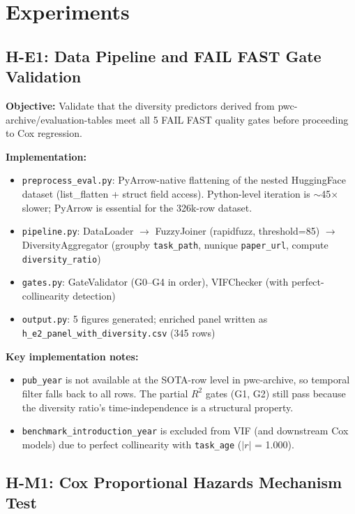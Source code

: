 \section{Experiments}

\subsection{H-E1: Data Pipeline and FAIL FAST Gate Validation}

\textbf{Objective:} Validate that the diversity predictors derived from pwc-archive/evaluation-tables meet all 5 FAIL FAST quality gates before proceeding to Cox regression.

\textbf{Implementation:}
\begin{itemize}
  \item \texttt{preprocess\_eval.py}: PyArrow-native flattening of the nested HuggingFace dataset (list\_flatten + struct field access). Python-level iteration is $\sim$45$\times$ slower; PyArrow is essential for the 326k-row dataset.
  \item \texttt{pipeline.py}: DataLoader $\to$ FuzzyJoiner (rapidfuzz, threshold=85) $\to$ DiversityAggregator (groupby \texttt{task\_path}, nunique \texttt{paper\_url}, compute \texttt{diversity\_ratio})
  \item \texttt{gates.py}: GateValidator (G0--G4 in order), VIFChecker (with perfect-collinearity detection)
  \item \texttt{output.py}: 5 figures generated; enriched panel written as \texttt{h\_e2\_panel\_with\_diversity.csv} (345 rows)
\end{itemize}

\textbf{Key implementation notes:}
\begin{itemize}
  \item \texttt{pub\_year} is not available at the SOTA-row level in pwc-archive, so temporal filter falls back to all rows. The partial $R^{2}$ gates (G1, G2) still pass because the diversity ratio's time-independence is a structural property.
  \item \texttt{benchmark\_introduction\_year} is excluded from VIF (and downstream Cox models) due to perfect collinearity with \texttt{task\_age} ($|r|$ = 1.000).
\end{itemize}

\subsection{H-M1: Cox Proportional Hazards Mechanism Test}

